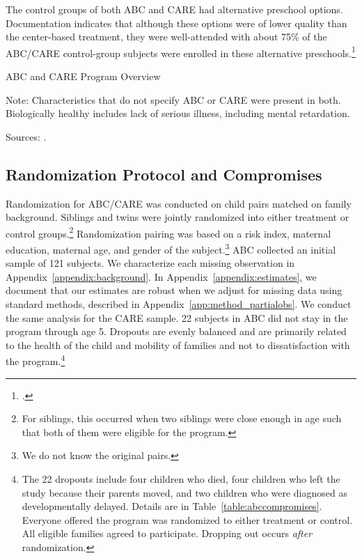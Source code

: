 The control groups of both ABC and CARE had alternative preschool options. Documentation indicates that although these options were of lower quality than the center-based treatment, they were well-attended with about 75\% of the ABC/CARE control-group subjects were enrolled in these alternative preschools.\footnote{\citet{Burchinal_etal_1989_CD_Daycare-Pre-K-Dev,Garcia_etal_2016_Comp_CBA_Unpublished}.}


\begin{table}[H]
\centering
\caption{ABC and CARE Program Overview}
\label{tab:abc-care-characteristics}
\begin{threeparttable}
	
\begin{tablenotes}
\item Note: Characteristics that do not specify ABC or CARE were present in both. Biologically healthy includes lack of serious illness, including mental retardation.
\item Sources: \citet{Ramey_Collier_etal_1976_CarolinaAbecedarianProject,Ramey_Smith_1977_AJMD,Ramey_etal_1985_Project-CARE_TiECSE,Wasik_Ramey_etal_1990_CD,Ramey_Campbell_1991_childreninpoverty}.
\end{tablenotes}
\end{threeparttable}
\end{table}

\subsection{Randomization Protocol and Compromises} \label{section:randomization}

Randomization for ABC/CARE was conducted on child pairs matched on family background. Siblings and twins were jointly randomized into either treatment or control groups.\footnote{For siblings, this occurred when two siblings were close enough in age such that both of them were eligible for the program.} Randomization pairing was based on a risk index, maternal education, maternal age, and gender of the subject.\footnote{We do not know the original pairs.} ABC collected an initial sample of 121 subjects. We characterize each missing observation in Appendix~\ref{appendix:background}. In Appendix~\ref{appendix:estimates}, we document that our estimates are robust when we adjust for missing data using standard methods, described in Appendix~\ref{app:method_partialobs}. We conduct the same analysis for the CARE sample. 22 subjects in ABC did not stay in the program through age 5. Dropouts are evenly balanced and are primarily related to the health of the child and mobility of families and not to dissatisfaction with the program.\footnote{The 22 dropouts include four children who died, four children who left the study because their parents moved, and two children who were diagnosed as developmentally delayed. Details are in Table~\ref{table:abccompromises}. Everyone offered the program was randomized to either treatment or control. All eligible families agreed to participate. Dropping out occurs \emph{after} randomization.}

